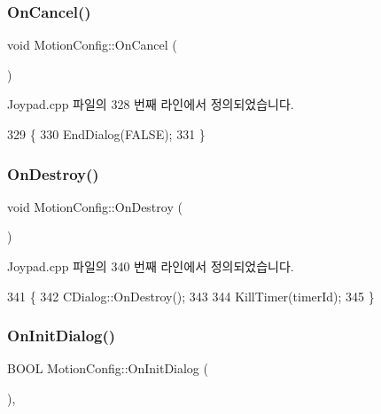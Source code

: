 \subsubsection{\texorpdfstring{On\+Cancel()}{OnCancel()}}
{\footnotesize\ttfamily void Motion\+Config\+::\+On\+Cancel (\begin{DoxyParamCaption}{ }\end{DoxyParamCaption})\hspace{0.3cm}{\ttfamily [protected]}}



Joypad.\+cpp 파일의 328 번째 라인에서 정의되었습니다.


\begin{DoxyCode}
329 \{
330   EndDialog(FALSE);
331 \}
\end{DoxyCode}
\mbox{\label{class_motion_config_a45547ed24ce1f7fdabd5754ec526d0a9}} 
\subsubsection{\texorpdfstring{On\+Destroy()}{OnDestroy()}}
{\footnotesize\ttfamily void Motion\+Config\+::\+On\+Destroy (\begin{DoxyParamCaption}{ }\end{DoxyParamCaption})\hspace{0.3cm}{\ttfamily [protected]}}



Joypad.\+cpp 파일의 340 번째 라인에서 정의되었습니다.


\begin{DoxyCode}
341 \{
342   CDialog::OnDestroy();
343   
344   KillTimer(timerId);
345 \}
\end{DoxyCode}
\mbox{\label{class_motion_config_ac1e282a94d14b433764eeae95b4cab6b}} 
\subsubsection{\texorpdfstring{On\+Init\+Dialog()}{OnInitDialog()}}
{\footnotesize\ttfamily B\+O\+OL Motion\+Config\+::\+On\+Init\+Dialog (\begin{DoxyParamCaption}{ }\end{DoxyParamCaption})\hspace{0.3cm}{\ttfamily [protected]}, {\ttfamily [virtual]}}



